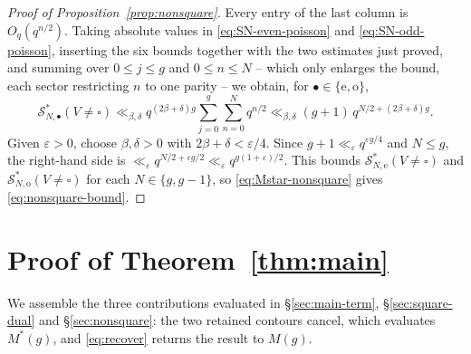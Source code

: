 \documentclass[a4paper,reqno]{amsart}
\numberwithin{equation}{section}
\theoremstyle{remark}
\theoremstyle{definition}
\begin{document}
\begin{proof}[Proof of Proposition~\ref{prop:nonsquare}]
Every entry of the last column is $O_q(q^{n/2})$. Taking absolute values in
\eqref{eq:SN-even-poisson} and \eqref{eq:SN-odd-poisson},
inserting the six bounds together with the two estimates just proved, and
summing over $0\le j\le g$ and $0\le n\le N$ -- which only enlarges the
bound, each sector restricting $n$ to one parity -- we obtain, for
$\bullet\in\{\mathrm e,\mathrm o\}$,
$$
\mathcal S_{N,\bullet}^{*}(V\ne\square)
\ll_{\beta,\delta}
q^{(2\beta+\delta)g}\sum_{j=0}^{g}\sum_{n=0}^{N}q^{n/2}
\ll_{\beta,\delta}(g+1)\,q^{N/2+(2\beta+\delta)g}.
$$
Given $\varepsilon>0$, choose $\beta,\delta>0$ with
$2\beta+\delta<\varepsilon/4$. Since
$g+1\ll_\varepsilon q^{\varepsilon g/4}$ and $N\le g$, the right-hand
side is $\ll_\varepsilon q^{N/2+\varepsilon g/2}\ll_\varepsilon
q^{g(1+\varepsilon)/2}$. This bounds
$\mathcal S_{N,\mathrm e}^{*}(V\ne\square)$ and
$\mathcal S_{N,\mathrm o}^{*}(V\ne\square)$ for each $N\in\{g,g-1\}$, so
\eqref{eq:Mstar-nonsquare} gives \eqref{eq:nonsquare-bound}.
\end{proof}

\section{Proof of Theorem~\ref{thm:main}}\label{sec:proof}

We assemble the three contributions evaluated in \S\ref{sec:main-term},
\S\ref{sec:square-dual} and \S\ref{sec:nonsquare}: the two retained contours
cancel, which evaluates $M^*(g)$, and \eqref{eq:recover} returns the result
to $M(g)$.
\end{document}
